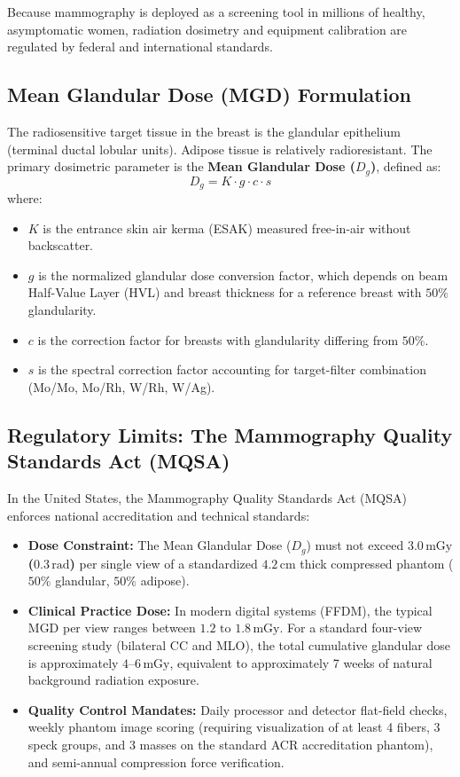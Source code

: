 \documentclass[11pt,a4paper]{article}
\begin{document}
Because mammography is deployed as a screening tool in millions of healthy, asymptomatic women, radiation dosimetry and equipment calibration are regulated by federal and international standards.

\subsection{Mean Glandular Dose (MGD) Formulation}

The radiosensitive target tissue in the breast is the glandular epithelium (terminal ductal lobular units). Adipose tissue is relatively radioresistant. The primary dosimetric parameter is the \textbf{Mean Glandular Dose ($D_g$)}, defined as:
\begin{equation}
    D_g = K \cdot g \cdot c \cdot s
\end{equation}
where:
\begin{itemize}[leftmargin=*]
    \item $K$ is the entrance skin air kerma (ESAK) measured free-in-air without backscatter.
    \item $g$ is the normalized glandular dose conversion factor, which depends on beam Half-Value Layer (HVL) and breast thickness for a reference breast with $50\%$ glandularity.
    \item $c$ is the correction factor for breasts with glandularity differing from $50\%$.
    \item $s$ is the spectral correction factor accounting for target-filter combination (Mo/Mo, Mo/Rh, W/Rh, W/Ag).
\end{itemize}

\subsection{Regulatory Limits: The Mammography Quality Standards Act (MQSA)}

In the United States, the Mammography Quality Standards Act (MQSA) enforces national accreditation and technical standards:
\begin{itemize}[leftmargin=*]
    \item \textbf{Dose Constraint:} The Mean Glandular Dose ($D_g$) must not exceed \textbf{$3.0\,\text{mGy}$ ($0.3\,\text{rad}$)} per single view of a standardized $4.2\,\text{cm}$ thick compressed phantom ($50\%$ glandular, $50\%$ adipose).
    \item \textbf{Clinical Practice Dose:} In modern digital systems (FFDM), the typical MGD per view ranges between \textbf{$1.2\text{ to }1.8\,\text{mGy}$}. For a standard four-view screening study (bilateral CC and MLO), the total cumulative glandular dose is approximately $4\text{--}6\,\text{mGy}$, equivalent to approximately 7 weeks of natural background radiation exposure.
    \item \textbf{Quality Control Mandates:} Daily processor and detector flat-field checks, weekly phantom image scoring (requiring visualization of at least 4 fibers, 3 speck groups, and 3 masses on the standard ACR accreditation phantom), and semi-annual compression force verification.
\end{itemize}
\end{document}

